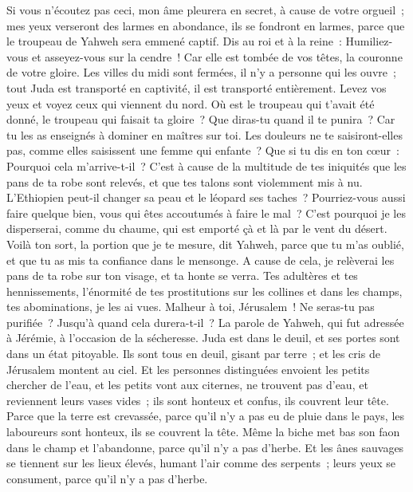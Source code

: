 \begin{multicols}{2}
Si vous n'écoutez pas ceci, mon âme pleurera en secret, à cause de votre orgueil~; mes yeux verseront des larmes en abondance, ils se fondront en larmes, parce que le troupeau de Yahweh sera emmené captif.
Dis au roi et à la reine~: Humiliez-vous et asseyez-vous sur la cendre~! Car elle est tombée de vos têtes, la couronne de votre gloire.
Les villes du midi sont fermées, il n'y a personne qui les ouvre~; tout Juda est transporté en captivité, il est transporté entièrement.
Levez vos yeux et voyez ceux qui viennent du nord. Où est le troupeau qui t'avait été donné, le troupeau qui faisait ta gloire~?
Que diras-tu quand il te punira~? Car tu les as enseignés à dominer en maîtres sur toi. Les douleurs ne te saisiront-elles pas, comme elles saisissent une femme qui enfante~?
Que si tu dis en ton cœur~: Pourquoi cela m'arrive-t-il~? C'est à cause de la multitude de tes iniquités que les pans de ta robe sont relevés, et que tes talons sont violemment mis à nu.
L'Ethiopien peut-il changer sa peau et le léopard ses taches~? Pourriez-vous aussi faire quelque bien, vous qui êtes accoutumés à faire le mal~?
C'est pourquoi je les disperserai, comme du chaume, qui est emporté çà et là par le vent du désert.
Voilà ton sort, la portion que je te mesure, dit Yahweh, parce que tu m'as oublié, et que tu as mis ta confiance dans le mensonge.
A cause de cela, je relèverai les pans de ta robe sur ton visage, et ta honte se verra.
Tes adultères et tes hennissements, l'énormité de tes prostitutions sur les collines et dans les champs, tes abominations, je les ai vues. Malheur à toi, Jérusalem~! Ne seras-tu pas purifiée~? Jusqu'à quand cela durera-t-il~?
\VerseOne{}La parole de Yahweh, qui fut adressée à Jérémie, à l'occasion de la sécheresse.
Juda est dans le deuil, et ses portes sont dans un état pitoyable. Ils sont tous en deuil, gisant par terre~; et les cris de Jérusalem montent au ciel.
Et les personnes distinguées envoient les petits chercher de l'eau, et les petits vont aux citernes, ne trouvent pas d'eau, et reviennent leurs vases vides~; ils sont honteux et confus, ils couvrent leur tête.
Parce que la terre est crevassée, parce qu'il n'y a pas eu de pluie dans le pays, les laboureurs sont honteux, ils se couvrent la tête.
Même la biche met bas son faon dans le champ et l'abandonne, parce qu'il n'y a pas d'herbe.
Et les ânes sauvages se tiennent sur les lieux élevés, humant l'air comme des serpents~; leurs yeux se consument, parce qu'il n'y a pas d'herbe.

\end{multicols}
